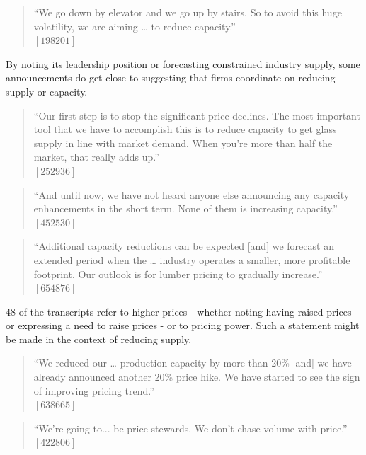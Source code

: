 \begin{quote}
``We go down by elevator and we go up by stairs. So to avoid this huge volatility, we are aiming … to reduce capacity.'' \\
$[198201]$
\end{quote}

By noting its leadership position or forecasting constrained industry supply, some announcements do get close to suggesting that firms coordinate on reducing supply or capacity.

\begin{quote}
``Our first step is to stop the significant price declines. The most important tool that we have to accomplish this is to reduce capacity to get glass supply in line with market demand. When you're more than half the market, that really adds up.'' \\
$[252936]$
\end{quote}

\begin{quote}
``And until now, we have not heard anyone else announcing any capacity enhancements in the short term. None of them is increasing capacity.'' \\
$[452530]$
\end{quote}

\begin{quote}
``Additional capacity reductions can be expected [and] we forecast an extended period when the … industry operates a smaller, more profitable footprint. Our outlook is for lumber pricing to gradually increase.'' \\
$[654876]$
\end{quote}

48 of the transcripts refer to higher prices - whether noting having raised prices or expressing a need to raise prices - or to pricing power. Such a statement might be made in the context of reducing supply.

\begin{quote}
``We reduced our … production capacity by more than 20\% [and] we have already announced another 20\% price hike. We have started to see the sign of improving pricing trend.'' \\
$[638665]$
\end{quote}

\begin{quote}
``We're going to... be price stewards. We don't chase volume with price.'' \\
$[422806]$
\end{quote}

